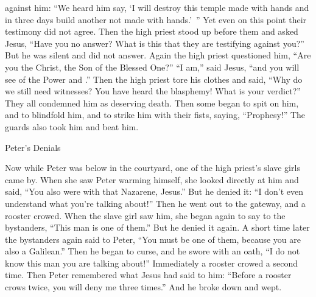 {against
him:
“We
heard
him
say,
‘I
will destroy
this
temple
made with hands
and
in
three
days
build
another
not made with hands.’ ”
Yet
even on this point
their
testimony
did
not
agree.
Then
the high priest
stood up
before
them and asked
Jesus,
“Have you
no
answer? What
is this
that they are testifying against
you?”
But
he was silent
and
did
not
answer.
Again
the high priest
questioned
him, “Are
you
the Christ,
the Son
of the Blessed One?”
“I
am,”
said
Jesus,
“and
you will see
{}
of the Power
and
{}.”
Then the high priest
tore
his
clothes
and said,
“Why
do we
still
need
witnesses?
You have heard
the blasphemy! What
is
your
verdict?” They
all
condemned
him
as deserving
death.
Then
some
began
to spit
on him,
and
to blindfold
him,
and to strike
him with
their fists,
saying,
“Prophesy!” The guards
also
took
him
and
beat
him.
\par }{\SH Peter’s Denials
\par }{\PP {}Now
while
Peter
was
below
in
the courtyard,
one
of the high priest’s
slave girls
came by.
When
she saw
Peter
warming
himself, she looked directly
at him
and
said,
“You
also were
with
that Nazarene,
Jesus.”
But
he denied
it: “I
don’t even
understand
what
you’re talking
about!” Then
he went
out
to
the gateway, and a rooster crowed.
When
the slave girl
saw
him,
she began
again
to say
to the bystanders,
“This man
is
one of
them.”
But
he denied
it again.
A short time
later
the bystanders
again
said
to Peter,
“You must be
one of
them,
because
you are
also
a Galilean.”
Then
he began
to curse,
and
he swore
with an oath, “I do
not
know
this
man
you are talking about!”
Immediately
a rooster
crowed
a second time.
Then
Peter
remembered
what Jesus
had said
to him: “Before
a rooster
crows
twice,
you will deny
me
three times.”
And he broke down
and
wept.

}
